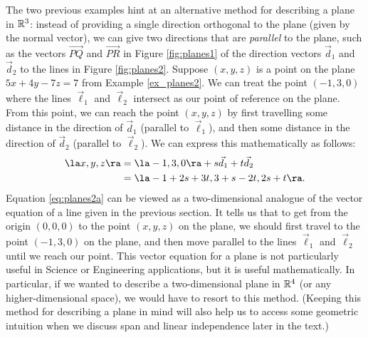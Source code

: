 The two previous examples hint at an alternative method for describing a plane in $\mathbb{R}^3$: instead of providing a single direction orthogonal to the plane (given by the normal vector), we can give two directions that are \textit{parallel} to the plane, such as the vectors $\overrightarrow{PQ}$ and $\overrightarrow{PR}$ in Figure \ref{fig:planes1} of the direction vectors $\vec{d}_1$ and $\vec{d}_2$ to the lines in Figure \ref{fig:planes2}. Suppose $(x,y,z)$ is a point on the plane $5x+4y-7z=7$ from Example \ref{ex_planes2}. We can treat the point $(-1,3,0)$ where the lines $\vec\ell_1$ and $\vec\ell_2$ intersect as our point of reference on the plane. From this point, we can reach the point $(x,y,z)$ by first travelling some distance in the direction of $\vec{d}_1$ (parallel to $\vec\ell_1$), and then some distance in the direction of $\vec{d}_2$ (parallel to $\vec\ell_2$). We can express this mathematically as follows:
\begin{align}
\la x,y,z\ra & = \la -1, 3, 0\ra + s\vec{d}_1+t\vec{d}_2\label{eq:planes2a}\\
 & = \la -1 +2s+3t, 3+s-2t, 2s+t\ra.\notag
\end{align}
Equation \eqref{eq:planes2a} can be viewed as a two-dimensional analogue of the vector equation of a line given in the previous section. It tells us that to get from the origin $(0,0,0)$ to the point $(x,y,z)$ on the plane, we should first travel to the point $(-1,3,0)$ on the plane, and then move parallel to the lines $\vec\ell_1$ and $\vec\ell_2$ until we reach our point. This vector equation for a plane is not particularly useful in Science or Engineering applications, but it is useful mathematically. In particular, if we wanted to describe a two-dimensional plane in $\mathbb{R}^4$ (or any higher-dimensional space), we would have to resort to this method. (Keeping this method for describing a plane in mind will also help us to access some geometric intuition when we discuss span and linear independence later in the text.)\\


